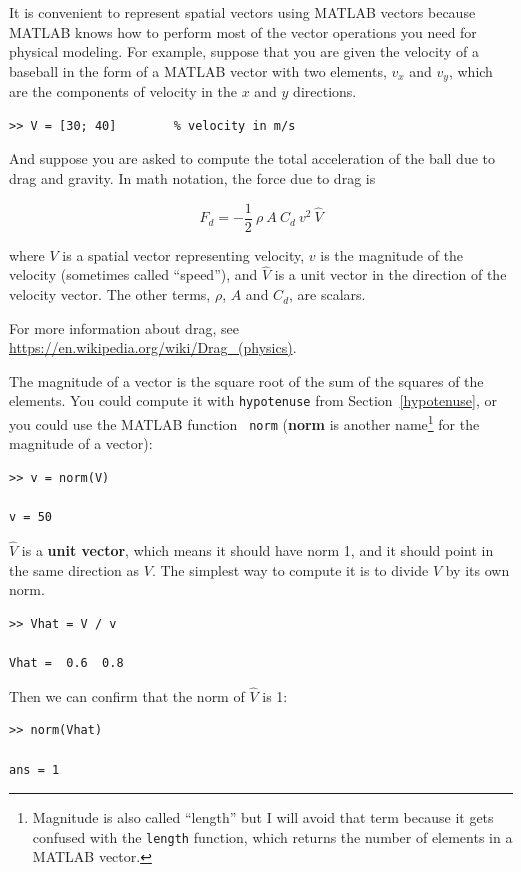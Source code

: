 \documentclass{book}
\begin{document}
It is convenient to represent spatial vectors using MATLAB vectors
because MATLAB knows how to perform most of the vector
operations you need for physical modeling.  For example,
suppose that you are given the velocity of a baseball in
the form of a MATLAB vector with two elements, $v_x$ and $v_y$,
which are the components of velocity in the $x$ and $y$ directions.

\begin{verbatim}
>> V = [30; 40]        % velocity in m/s
\end{verbatim}

And suppose you are asked to compute the total acceleration of
the ball due to drag and gravity.  In math notation, the force
due to drag is

\[ F_d = -\frac{1}{2} ~ \rho ~ A ~ C_d ~ v^2 ~ \hat{V}   \]

where $V$ is a spatial vector representing velocity, $v$ is the magnitude
of the velocity (sometimes called ``speed''), and $\hat{V}$ is a unit
vector in the direction of the velocity vector.  The other terms,
$\rho$, $A$ and $C_d$, are scalars.

For more information about drag, see
\url{https://en.wikipedia.org/wiki/Drag_(physics)}.

The magnitude of a vector is the square root of the sum of the squares
of the elements.  You could compute it with {\tt hypotenuse} from
Section~\ref{hypotenuse}, or you could use the MATLAB function {\tt
norm} ({\bf norm} is another name\footnote{Magnitude is also called
``length'' but I will avoid that term because it gets confused with
the {\tt length} function, which returns the number of elements in a
MATLAB vector.}  for the magnitude of a vector):

\begin{verbatim}
>> v = norm(V)

v = 50
\end{verbatim}

$\hat{V}$ is a {\bf unit vector}, which means it should have norm 1,
and it should point in the same direction as $V$.  The simplest
way to compute it is to divide $V$ by its own norm.

\begin{verbatim}
>> Vhat = V / v

Vhat =  0.6  0.8
\end{verbatim}

Then we can confirm that the norm of $\hat{V}$ is 1:

\begin{verbatim}
>> norm(Vhat)

ans = 1
\end{verbatim}
\end{document}
